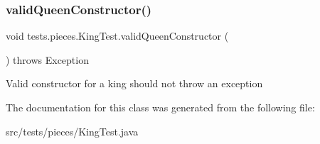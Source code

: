 \subsubsection{\texorpdfstring{valid\+Queen\+Constructor()}{validQueenConstructor()}}
{\footnotesize\ttfamily void tests.\+pieces.\+King\+Test.\+valid\+Queen\+Constructor (\begin{DoxyParamCaption}{ }\end{DoxyParamCaption}) throws Exception}

Valid constructor for a king should not throw an exception 

The documentation for this class was generated from the following file\+:\begin{DoxyCompactItemize}
\item 
src/tests/pieces/King\+Test.\+java\end{DoxyCompactItemize}
